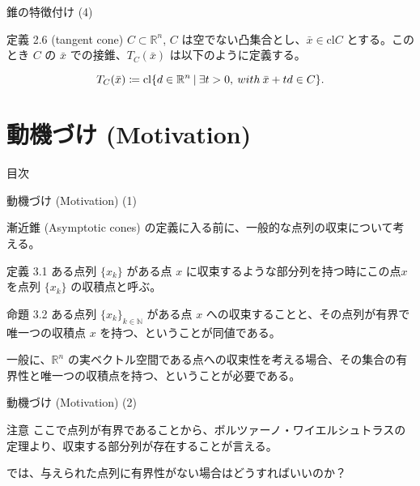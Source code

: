 \documentclass[aspectratio=169, dvipdfmx, 11pt]{beamer} %
\begin{document}
\begin{frame}{錐の特徴付け (4)}
  \begin{block}{定義 2.6 (tangent cone) }
    $C \subset \mathbb{R}^n$, $C$ は空でない凸集合とし、$\bar{x} \in \text{cl}C$ とする。このとき $C$ の $\bar{x}$ での接錐、$T_C(\bar{x})$ は以下のように定義する。

    \begin{equation}
      T_C(\bar{x}) \coloneqq \text{cl}\{ d \in \mathbb{R}^n \:|\: \exists t > 0, \:with\: \bar{x} + td \in C \}. \notag
    \end{equation}

  \end{block}
\end{frame}

\section{動機づけ (Motivation) }
\begin{frame}{目次}
    \tableofcontents[currentsection]
\end{frame}

\begin{frame}{動機づけ (Motivation) (1) }

  漸近錐 (Asymptotic cones) の定義に入る前に、一般的な点列の収束について考える。

  \begin{block}{定義 3.1}
    ある点列 $\{ x_k \}$ がある点 $x$ に収束するような部分列を持つ時にこの点$x$ を点列 $\{ x_k \}$ の収積点と呼ぶ。
  \end{block}

  \begin{block}{命題 3.2}
    ある点列 $\{ x_k \}_{k \in \mathbb{N}}$ がある点 $x$ への収束することと、その点列が有界で唯一つの収積点 $x$ を持つ、ということが同値である。
  \end{block}

  一般に、$\mathbb{R} ^n$ の実ベクトル空間である点への収束性を考える場合、その集合の有界性と唯一つの収積点を持つ、ということが必要である。
\end{frame}

\begin{frame}{動機づけ (Motivation) (2) }
  \begin{alertblock}{注意}
    ここで点列が有界であることから、ボルツァーノ・ワイエルシュトラスの定理より、収束する部分列が存在することが言える。
  \end{alertblock}

\pause

  では、与えられた点列に有界性がない場合はどうすればいいのか？
\end{frame}
\end{document}
